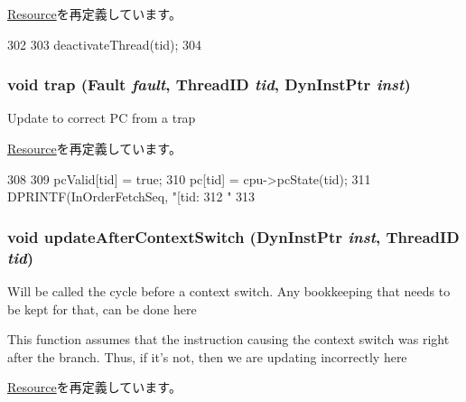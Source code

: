\hyperlink{classResource_ad2f3fddbc6dd67ef5e3a84cd7a9814e6}{Resource}を再定義しています。


\begin{DoxyCode}
302 {
303     deactivateThread(tid);    
304 }
\end{DoxyCode}
\hypertarget{classFetchSeqUnit_abf76d6d245f7d3b17d26ea8dcc0cf36f}{
\subsubsection[{trap}]{\setlength{\rightskip}{0pt plus 5cm}void trap ({\bf Fault} {\em fault}, \/  {\bf ThreadID} {\em tid}, \/  {\bf DynInstPtr} {\em inst})}}
\label{classFetchSeqUnit_abf76d6d245f7d3b17d26ea8dcc0cf36f}
Update to correct PC from a trap 

\hyperlink{classResource_a1eb2a0229740a87bde0282416035b864}{Resource}を再定義しています。


\begin{DoxyCode}
308 {
309     pcValid[tid] = true;
310     pc[tid] = cpu->pcState(tid);
311     DPRINTF(InOrderFetchSeq, "[tid:%
312             "%
313 }
\end{DoxyCode}
\hypertarget{classFetchSeqUnit_a339073618ad3c21c492d64a55ce2e216}{
\subsubsection[{updateAfterContextSwitch}]{\setlength{\rightskip}{0pt plus 5cm}void updateAfterContextSwitch ({\bf DynInstPtr} {\em inst}, \/  {\bf ThreadID} {\em tid})}}
\label{classFetchSeqUnit_a339073618ad3c21c492d64a55ce2e216}
Will be called the cycle before a context switch. Any bookkeeping that needs to be kept for that, can be done here 

This function assumes that the instruction causing the context switch was right after the branch. Thus, if it's not, then we are updating incorrectly here

\hyperlink{classResource_a2cf5450ce736e0c76aca0d4ef24b922a}{Resource}を再定義しています。


